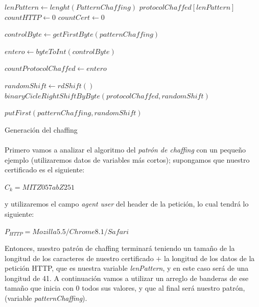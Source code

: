 \documentclass[12pt, a4paper, titlepage]{report}
\begin{document}
            \newpage
            
            \begin{algorithm}[H]
                \SetAlgoLined
                
                $lenPattern \longleftarrow lenght(PatternChaffing)$\;
                $protocolChaffed[lenPattern]$
                $countHTTP \longleftarrow 0$\;
                $countCert \longleftarrow 0$\;
                
                $controlByte \longleftarrow getFirstByte(patternChaffing)$\;
                
                $entero \longleftarrow byteToInt(controlByte)$\;
                
                $countProtocolChaffed \longleftarrow entero$\;
                
                $randomShift \longleftarrow rdShift()$\;
                $binaryCicleRightShiftByByte(protocolChaffed, randomShift)$\;
                
                $putFirst(patternChaffing, randomShift)$\;
                
                \caption{Generación del chaffing}
            \end{algorithm}
            
		   \paragraph{}
		   Primero vamos a analizar el algoritmo del \textit{patrón de chaffing} con un pequeño ejemplo (utilizaremos datos de variables más cortos); supongamos que nuestro certificado es el siguiente: 
		    \begin{center}
		        $C_k = MITZ057abZ251$
		    \end{center}
		    y utilizaremos el campo \textit{agent user} del header de la petición, lo cual tendrá lo siguiente:
		    \begin{center}
		        $P_{HTTP} = Mozilla5.5/Chrome8.1/Safari$
		    \end{center}
		    Entonces, nuestro patrón de chaffing terminará teniendo un tamaño de la longitud de los caracteres de nuestro certificado $+$ la longitud de los datos de la petición HTTP, que es nuestra variable \textit{lenPattern}, y en este caso será de una longitud de 41. A continuación vamos a utilizar un arreglo de banderas de ese tamaño que inicia con 0 todos sus valores, y que al final será nuestro patrón, (variable \textit{patternChaffing}).\\
		    
\end{document}
